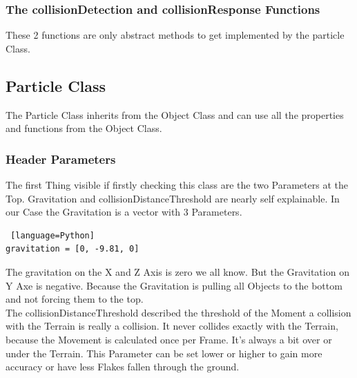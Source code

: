 \documentclass{sig-alternate-05-2015}
\begin{document}
\subsubsection{The collisionDetection and collisionResponse Functions}
These 2 functions are only abstract methods to get implemented by the particle Class.\\
\subsection{Particle Class}
The Particle Class inherits from the Object Class and can use all the properties and functions from the Object Class.
\subsubsection{Header Parameters}
The first Thing visible if firstly checking this class are the two Parameters at the Top. Gravitation and collisionDistanceThreshold are nearly self explainable. In our Case the Gravitation is a vector with 3 Parameters. \\
\begin{lstlisting} [language=Python]
gravitation = [0, -9.81, 0]
\end{lstlisting}
The gravitation on the X and Z Axis is zero we all know. But the Gravitation on Y Axe is negative. Because the Gravitation is pulling all Objects to the bottom and not forcing them to the top. \\
The collisionDistanceThreshold described the threshold of the Moment a collision with the Terrain is really a collision. It never collides exactly with the Terrain, because the Movement is calculated once per Frame. It's always a bit over or under the Terrain. This Parameter can be set lower or higher to gain more accuracy or have less Flakes fallen through the ground.\\
\end{document}
